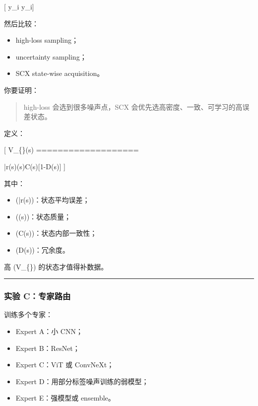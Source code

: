 \documentclass[
  12pt,
]{ctexart}
\providecommand{\tightlist}{%
  \setlength{\itemsep}{0pt}\setlength{\parskip}{0pt}}
\begin{document}
{[} y\_i \rightarrow \tilde y\_i{]}

然后比较：

\begin{itemize}
\tightlist
\item
  high-loss sampling；
\item
  uncertainty sampling；
\item
  SCX state-wise acquisition。
\end{itemize}

你要证明：

\begin{quote}
high-loss 会选到很多噪声点，SCX
会优先选高密度、一致、可学习的高误差状态。
\end{quote}

定义：

{[} V\_\{\}(s) ===================

\bar r(s)\rho(s)C(s){[}1-D(s){]} {]}

其中：

\begin{itemize}
\tightlist
\item
  (\bar r(s))：状态平均误差；
\item
  (\rho(s))：状态质量；
\item
  (C(s))：状态内部一致性；
\item
  (D(s))：冗余度。
\end{itemize}

高 (V\_\{\}) 的状态才值得补数据。

\begin{center}\rule{0.5\linewidth}{0.5pt}\end{center}

\subsubsection{实验
C：专家路由}\label{ux5b9eux9a8c-cux4e13ux5bb6ux8defux7531}

训练多个专家：

\begin{itemize}
\tightlist
\item
  Expert A：小 CNN；
\item
  Expert B：ResNet；
\item
  Expert C：ViT 或 ConvNeXt；
\item
  Expert D：用部分标签噪声训练的弱模型；
\item
  Expert E：强模型或 ensemble。
\end{itemize}
\end{document}
